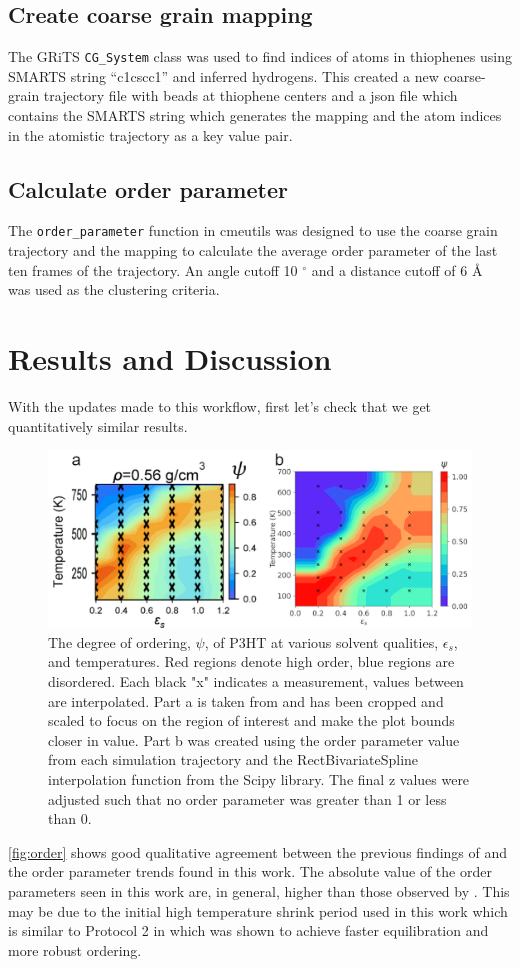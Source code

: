 \subsection{Create coarse grain mapping}
The GRiTS \lstinline{CG_System} class was used to find indices of atoms in thiophenes using SMARTS string ``c1cscc1'' and inferred hydrogens. This created a new coarse-grain trajectory file with beads at thiophene centers and a json file which contains the SMARTS string which generates the mapping and the atom indices in the atomistic trajectory as a key value pair.

\subsection{Calculate order parameter}
The \lstinline{order_parameter} function in cmeutils was designed to use the coarse grain trajectory and the mapping to calculate the average order parameter of the last ten frames of the trajectory. An angle cutoff 10 $^{\circ}$ and a distance cutoff of 6 \AA~ was used as the clustering criteria.

\section{Results and Discussion}

With the updates made to this workflow, first let's check that we get quantitatively similar results.
\begin{figure}
    \centering
    \includegraphics[width=0.8\linewidth]{figures/p3ht_val/Miller2018_fig3comparison.png}
    \caption{The degree of ordering, $\psi$, of P3HT at various solvent qualities, $\epsilon_{s}$, and temperatures. Red regions denote high order, blue regions are disordered. Each black "x" indicates a measurement, values between are interpolated. Part a is taken from \citet[Figure 3a]{Miller2018} and has been cropped and scaled to focus on the region of interest and make the plot bounds closer in value. Part b was created using the order parameter value from each simulation trajectory and the RectBivariateSpline interpolation function from the Scipy library. The final z values were adjusted such that no order parameter was greater than 1 or less than 0.}\label{fig:order}
\end{figure}
\autoref{fig:order} shows good qualitative agreement between the previous findings of \citet{Miller2018} and the order parameter trends found in this work. The absolute value of the order parameters seen in this work are, in general, higher than those observed by \citet{Miller2018}. This may be due to the initial high temperature shrink period used in this work which is similar to Protocol 2 in \citet{Miller2018} which was shown to achieve faster equilibration and more robust ordering.


